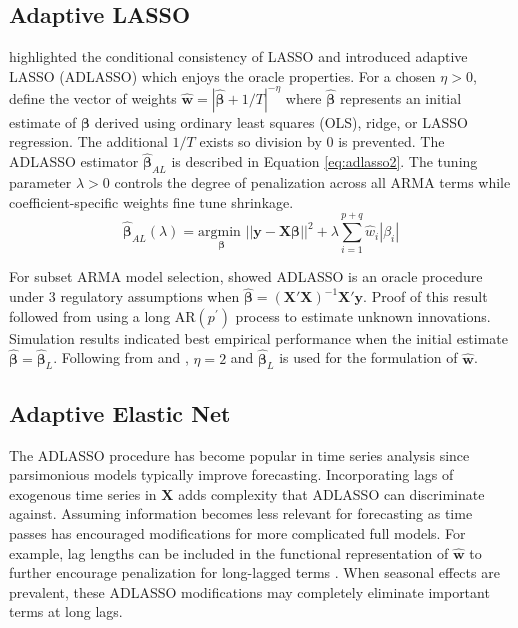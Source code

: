 \subsection{Adaptive LASSO}

\cite{Zou2006} highlighted the conditional consistency of LASSO and introduced adaptive LASSO (ADLASSO) which enjoys the oracle properties. For a chosen $\eta>0$, define the vector of weights $\hat{\bm{w}}=|\hat{\bm{\beta}}+1/T|^{-\eta}$ where $\hat{\bm{\beta}}$ represents an initial estimate of $\bm{\beta}$ derived using ordinary least squares (OLS), ridge, or LASSO regression. The additional $1/T$ exists so division by $0$ is prevented. The ADLASSO estimator $\hat{\bm{\beta}}_{AL}$ is described in Equation \ref{eq:adlasso2}. The tuning parameter $\lambda>0$ controls the degree of penalization across all ARMA terms while coefficient-specific weights fine tune shrinkage.
\begin{equation}
\label{eq:adlasso2}
\hat{\bm{\beta}}_{AL} (\lambda)= \underset{\bm{\beta}}{\textrm{argmin }}  ||\bm{y}-\bm{X}\bm{\beta}||^2 + \lambda \sum\limits_{i=1}^{p+q} \hat{w}_{i}|\beta_i|
\end{equation}

For subset ARMA model selection, \cite{Chen2011} showed ADLASSO is an oracle procedure under 3 regulatory assumptions when $\hat{\bm{\beta}}=(\bm{X}'\bm{X})^{-1}\bm{X}'\bm{y}$. Proof of this result followed from using a long AR$(p^\prime)$ process to estimate unknown innovations. Simulation results indicated best empirical performance when the initial estimate $\hat{\bm{\beta}}=\hat{\bm{\beta}}_L$. Following from \cite{Zou2006} and \cite{Chen2011}, $\eta=2$ and $\hat{\bm{\beta}}_L$ is used for the formulation of $\hat{\bm{w}}$.

\subsection{Adaptive Elastic Net}
The ADLASSO procedure has become popular in time series analysis since parsimonious models typically improve forecasting. Incorporating lags of exogenous time series in $\bm{X}$ adds complexity that ADLASSO can discriminate against. Assuming information becomes less relevant for forecasting as time passes has encouraged modifications for more complicated full models. For example, lag lengths can be included in the functional representation of $\hat{\bm{w}}$ to further encourage penalization for long-lagged terms \citep{Park2013,Konzen2016}. When seasonal effects are prevalent, these ADLASSO modifications may completely eliminate important terms at long lags. 

